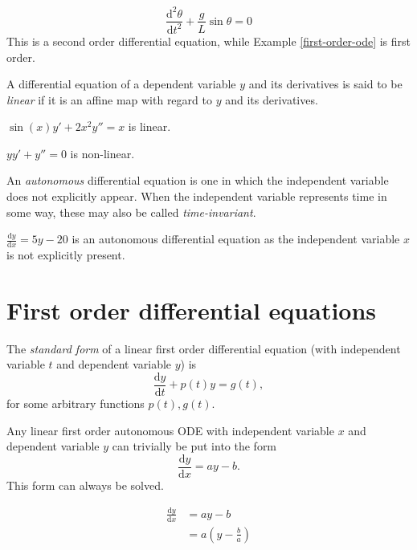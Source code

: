 \begin{exmp}
    \[\frac{\mathrm{d}^2\theta}{\mathrm{d}t^2} + \frac{g}{L}\sin\theta = 0\]
    This is a second order differential equation, while Example \ref{first-order-ode} is first order.
\end{exmp}

\begin{defn}
    A differential equation of a dependent variable $y$ and its derivatives is said to be \emph{linear} if it is an affine map with regard to $y$ and its derivatives.
\end{defn}

\begin{exmp}
    $\sin(x)y' + 2x^2y'' = x$ is linear.
\end{exmp}

\begin{exmp}
    $yy' + y'' = 0$ is non-linear.
\end{exmp}

\begin{defn}
    An \emph{autonomous} differential equation is one in which the independent variable does not explicitly appear. When the independent variable represents time in some way, these may also be called \emph{time-invariant}.
\end{defn}

\begin{exmp}
    $\frac{\mathrm{d}y}{\mathrm{d}x} = 5y - 20$ is an autonomous differential equation as the independent variable $x$ is not explicitly present.
\end{exmp}

\section{First order differential equations}

\begin{defn}
    The \emph{standard form} of a linear first order differential equation (with independent variable $t$ and dependent variable $y$) is \[\frac{\mathrm{d}y}{\mathrm{d}t} + p(t)y = g(t),\] for some arbitrary functions $p(t), g(t)$.
\end{defn}

Any linear first order autonomous ODE with independent variable $x$ and dependent variable $y$ can trivially be put into the form \[\frac{\mathrm{d}y}{\mathrm{d}x} = ay - b.\] This form can always be solved.

\begin{align*}
    \frac{\mathrm{d}y}{\mathrm{d}x} &= ay - b \\
    &= a(y - \frac{b}{a})
\end{align*}

